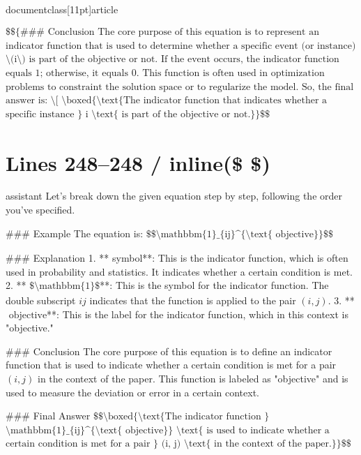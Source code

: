 \\documentclass[11pt]{article}
\begin{document}
\[{### Conclusion
The core purpose of this equation is to represent an indicator function that is used to determine whether a specific event (or instance) \(i\) is part of the objective or not. If the event occurs, the indicator function equals 1; otherwise, it equals 0. This function is often used in optimization problems to constraint the solution space or to regularize the model.

So, the final answer is:
\[
\boxed{\text{The indicator function that indicates whether a specific instance } i \text{ is part of the objective or not.}}
\]


\section*{Lines 248–248 / inline(\$ \$) }
assistant
Let's break down the given equation step by step, following the order you've specified.

### Example
The equation is:
\[
\mathbbm{1}_{ij}^{\text{ objective}}
\]

### Explanation
1. ** symbol**: This is the indicator function, which is often used in probability and statistics. It indicates whether a certain condition is met.
2. ** \( \mathbbm{1} \)**: This is the symbol for the indicator function. The double subscript \(ij\) indicates that the function is applied to the pair \((i, j)\).
3. ** \( \text{ objective} \)**: This is the label for the indicator function, which in this context is "objective."

### Conclusion
The core purpose of this equation is to define an indicator function that is used to indicate whether a certain condition is met for a pair \((i, j)\) in the context of the paper. This function is labeled as "objective" and is used to measure the deviation or error in a certain context.

### Final Answer
\[
\boxed{\text{The indicator function } \mathbbm{1}_{ij}^{\text{ objective}} \text{ is used to indicate whether a certain condition is met for a pair } (i, j) \text{ in the context of the paper.}}
\]
\end{document}
